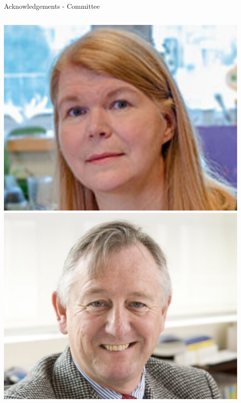 \documentclass[aspectratio=169]{beamer}
\begin{document}
\appendix

\iffalse

\begin{frame}{Acknowledgements - Committee}
    \begin{columns}
            \centering
            \includegraphics[width=0.95\textwidth]{people/milnergroup/janet2.png}
            \includegraphics[width=0.95\textwidth]{people/milnergroup/richard.png}

\end{columns}
\end{frame}
\end{document}
